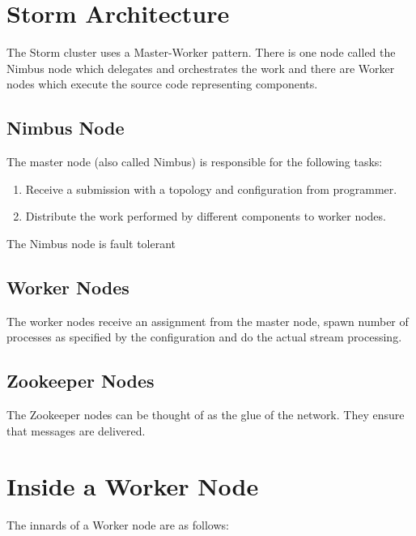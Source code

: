 \documentclass[bsc,logo,frontabs,twoside,singlespacing,normalheadings,parskip]{infthesis}     %
\begin{document}
\newpage

\section{Storm Architecture}

The Storm cluster uses a Master-Worker pattern. There is one node called the Nimbus node which delegates and orchestrates the work and there are Worker nodes which execute the source code representing components.

\subsection{Nimbus Node}

The master node (also called Nimbus) is responsible for the following tasks:

\begin{enumerate}
	\item Receive a submission with a topology and configuration from programmer.
	\item Distribute the work performed by different components to worker nodes.
\end{enumerate}

The Nimbus node is fault tolerant

\subsection{Worker Nodes}

The worker nodes receive an assignment from the master node, spawn number of processes as specified by the configuration and do the actual stream processing.

\subsection{Zookeeper Nodes}

The Zookeeper nodes can be thought of as the glue of the network. They ensure that messages are delivered.

\section{Inside a Worker Node}

The innards of a Worker node are as follows:
\end{document}
